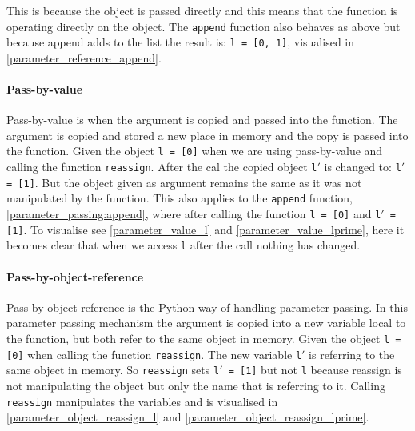 
This is because the object is passed directly and this means that the function is operating directly on the object.
The \texttt{append} function also behaves as above but because append adds to the list the result is: \texttt{l = [0, 1]}, visualised in \cref{parameter_reference_append}.


\paragraph{Pass-by-value}
Pass-by-value is when the argument is copied and passed into the function.
The argument is copied and stored a new place in memory and the copy is passed into the function.
Given the object \texttt{l = [0]} when we are using pass-by-value and calling the function \texttt{reassign}.
After the cal the copied object \texttt{l$'$} is changed to: \texttt{l$'$ = [1]}.
But the object given as argument remains the same as it was not manipulated by the function.
This also applies to the \texttt{append} function, \cref{parameter_passing:append}, where after calling the function \texttt{l = [0]} and \texttt{l$'$ = [1]}.
To visualise see \cref{parameter_value_l} and \cref{parameter_value_lprime}, here it becomes clear that when we access \texttt{l} after the call nothing has changed.


\paragraph{Pass-by-object-reference}
Pass-by-object-reference is the Python way of handling parameter passing.
In this parameter passing mechanism the argument is copied into a new variable local to the function, but both refer to the same object in memory.
Given the object \texttt{l = [0]} when calling the function \texttt{reassign}.
The new variable \texttt{l$'$} is referring to the same object in memory.
So \texttt{reassign} sets \texttt{l$'$ = [1]} but not \texttt{l} because reassign is not manipulating the object but only the name that is referring to it.
Calling \texttt{reassign} manipulates the variables and is visualised in \cref{parameter_object_reassign_l} and \cref{parameter_object_reassign_lprime}.

